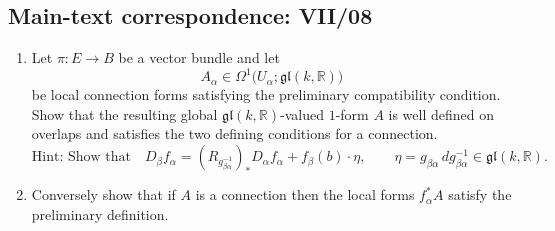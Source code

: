 \subsection*{Main-text correspondence: VII/08}

\begin{problem}
\label{prob:cp-vii-0030}
\begin{enumerate}[label=(\alph*)]
\item Let \(\pi:E\to B\) be a vector bundle and let
\[
A_\alpha\in\Omega^1\!\bigl(U_\alpha;\mathfrak{gl}(k,\mathbb R)\bigr)
\]
be local connection forms satisfying the preliminary compatibility condition.
Show that the resulting global
\(\mathfrak{gl}(k,\mathbb R)\)-valued \(1\)-form \(A\) is well defined on overlaps and satisfies the two defining conditions for a connection.
	\[
	\text{Hint: Show that}\quad
	D_\beta f_\alpha
	=
	(R_{g_{\beta\alpha}^{-1}})_*D_\alpha f_\alpha
	+
	f_\beta(b)\cdot\eta,
	\qquad
	\eta=g_{\beta\alpha}\,dg_{\beta\alpha}^{-1}\in\mathfrak{gl}(k,\mathbb{R}).
	\]
	\item Conversely show that if $A$ is a connection then the local forms $f_\alpha^*A$ satisfy the preliminary definition.
\end{enumerate}
\end{problem}

